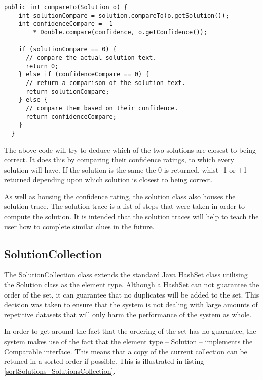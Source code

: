 \begin{lstlisting}[caption={compareTo() compares two solutions},
                   label=compareToSolution] 
  public int compareTo(Solution o) {
    int solutionCompare = solution.compareTo(o.getSolution());
    int confidenceCompare = -1
        * Double.compare(confidence, o.getConfidence());

    if (solutionCompare == 0) {
      // compare the actual solution text.
      return 0;
    } else if (confidenceCompare == 0) {
      // return a comparison of the solution text. 
      return solutionCompare;
    } else {
      // compare them based on their confidence.
      return confidenceCompare;
    }
  }
\end{lstlisting}

The above code will try to deduce which of the two solutions are closest to 
being correct. It does this by comparing their confidence ratings, to which 
every solution will have. If the solution is the same the 0 is returned, whist 
-1 or +1 returned depending upon which solution is closest to being correct.

As well as housing the confidence rating, the solution class also houses the
solution trace. The solution trace is a list of steps that were taken in order 
to compute the solution. It is intended that the solution traces will help to 
teach the user how to complete similar clues in the future. 


\subsection{SolutionCollection}
\label{sub:solution_collection}

The SolutionCollection class extends the standard Java HashSet class utilising 
the Solution class as the element type. Although a HashSet can not guarantee the
order of the set, it can guarantee that no duplicates will be added to the set.
This decision was taken to ensure that the system is not dealing with large 
amounts of repetitive datasets that will only harm the performance of the 
system as whole.

In order to get around the fact that the ordering of the set has no guarantee,
the system makes use of the fact that the element type -- Solution -- implements
the Comparable interface. This means that a copy of the current collection can 
be retuned in a sorted order if possible. This is illustrated in listing 
\ref{sortSolutions_SolutionsCollection}.

